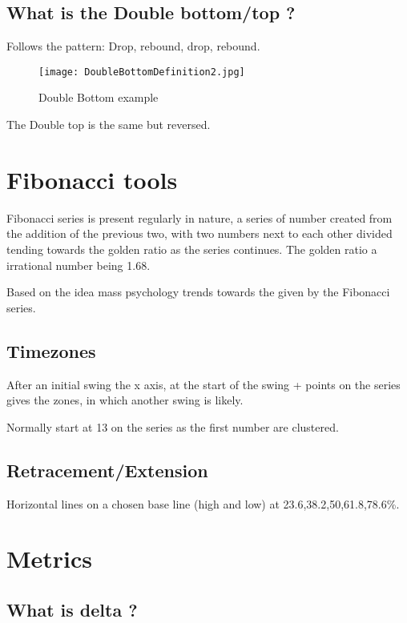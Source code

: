 \documentclass[11pt]{scrartcl} %
\begin{document}
\subsection{What is the Double bottom/top ?}

Follows the pattern: Drop, rebound, drop, rebound.

\begin{figure}[h] %
	\centering
	\texttt{[image: DoubleBottomDefinition2.jpg]} %
	\caption{Double Bottom example}
\end{figure}

The Double top is the same but reversed.

\section{Fibonacci tools}

Fibonacci series is present regularly in nature, a series of number created from the addition of the
previous two, with two numbers next to each other divided tending towards the golden ratio as the 
series continues. The golden ratio a irrational number being 1.68.

Based on the idea mass psychology trends towards the given by the Fibonacci series.

\subsection{Timezones}

After an initial swing the x axis, at the start of the swing + points on the series gives the zones,
in which another swing is likely.

Normally start at 13 on the series as the first number are clustered.

\subsection{Retracement/Extension}

Horizontal lines on a chosen base line (high and low) at 23.6,38.2,50,61.8,78.6\%.

\section{Metrics}

\subsection{What is delta ?}
\end{document}
